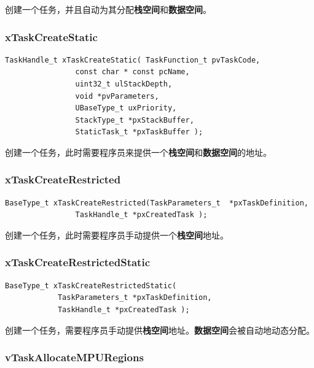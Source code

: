\documentclass[12pt, a4paper]{article}
\begin{document}
创建一个任务，并且自动为其分配\textbf{栈空间}和\textbf{数据空间}。

\subsubsection {xTaskCreateStatic}

\begin{lstlisting}[language={[ANSI]C},keywordstyle=\color{blue!70},commentstyle=\color{red!50!green!50!blue!50},frame=shadowbox, rulesepcolor=\color{red!20!green!20!blue!20}]
TaskHandle_t xTaskCreateStatic( TaskFunction_t pvTaskCode,
				const char * const pcName,
				uint32_t ulStackDepth,
				void *pvParameters,
				UBaseType_t uxPriority,
				StackType_t *pxStackBuffer,
				StaticTask_t *pxTaskBuffer );
\end{lstlisting}
创建一个任务，此时需要程序员来提供一个\textbf{栈空间}和\textbf{数据空间}的地址。

\subsubsection {xTaskCreateRestricted}
\begin{lstlisting}[language={[ANSI]C},keywordstyle=\color{blue!70},commentstyle=\color{red!50!green!50!blue!50},frame=shadowbox, rulesepcolor=\color{red!20!green!20!blue!20}]
BaseType_t xTaskCreateRestricted(TaskParameters_t  *pxTaskDefinition,
				TaskHandle_t *pxCreatedTask );
\end{lstlisting}

创建一个任务，此时需要程序员手动提供一个\textbf{栈空间}地址。

\subsubsection {xTaskCreateRestrictedStatic}

\begin{lstlisting}[language={[ANSI]C},keywordstyle=\color{blue!70},commentstyle=\color{red!50!green!50!blue!50},frame=shadowbox, rulesepcolor=\color{red!20!green!20!blue!20}]
 BaseType_t xTaskCreateRestrictedStatic( 
 			TaskParameters_t *pxTaskDefinition, 
 			TaskHandle_t *pxCreatedTask );
\end{lstlisting}

创建一个任务，需要程序员手动提供\textbf{栈空间}地址。\textbf{数据空间}会被自动地动态分配。

\subsubsection {vTaskAllocateMPURegions}
\end{document}
